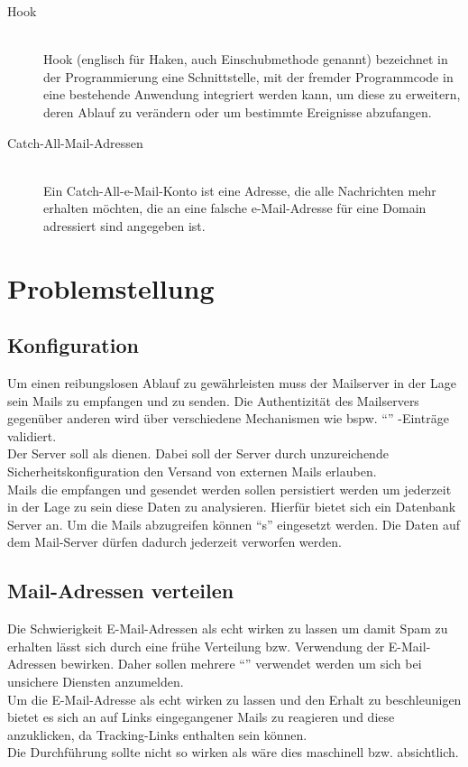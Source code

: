 \documentclass[a4paper,11pt,singlespacing]{article}
\begin{document}
\begin{description}
	\item[Hook\label{itm:Hook}]\hfill \\
		Hook (englisch für Haken, auch Einschubmethode genannt) bezeichnet in der Programmierung eine Schnittstelle, mit der fremder Programmcode in eine bestehende Anwendung integriert werden kann, um diese zu erweitern, deren Ablauf zu verändern oder um bestimmte Ereignisse abzufangen.\cite{Hook}
	\item[Catch-All-Mail-Adressen\label{itm:Catch-All-Mail}]\hfill \\
		Ein Catch-All-e-Mail-Konto ist eine Adresse, die alle Nachrichten mehr erhalten möchten, die an eine falsche e-Mail-Adresse für eine Domain adressiert sind angegeben ist.\cite{Catch-All-Mail}
	\end{description}


\section{Problemstellung}\label{sec:Problemstellung}
	\subsection{Konfiguration}\label{sec:ProblemstellungKonfiguration}
		Um einen reibungslosen Ablauf zu gewährleisten muss der Mailserver in der Lage sein Mails zu empfangen und zu senden.
		Die Authentizität des Mailservers gegenüber anderen wird über verschiedene Mechanismen wie bspw. "`"' -Einträge validiert.
		\\
		Der Server soll als  dienen.
		Dabei soll der Server durch unzureichende Sicherheitskonfiguration den Versand von externen Mails erlauben.
		\\
		Mails die empfangen und gesendet werden sollen persistiert werden um jederzeit in der Lage zu sein diese Daten zu analysieren.
		Hierfür bietet sich ein Datenbank Server an. Um die Mails abzugreifen können "`s"' eingesetzt werden.
		Die Daten auf dem Mail-Server dürfen dadurch jederzeit verworfen werden.

	\subsection{Mail-Adressen verteilen}\label{sec:ProblemstellungMailsVerteilen}
		Die Schwierigkeit E-Mail-Adressen als echt wirken zu lassen um damit Spam zu erhalten lässt sich durch eine frühe Verteilung bzw. Verwendung der E-Mail-Adressen bewirken.
		Daher sollen mehrere "`"' verwendet werden um sich bei unsichere Diensten anzumelden.
		\\
		Um die E-Mail-Adresse als echt wirken zu lassen und den Erhalt zu beschleunigen bietet es sich an auf Links eingegangener Mails zu reagieren und diese anzuklicken, da Tracking-Links enthalten sein können. %
		\\
		Die Durchführung sollte nicht so wirken als wäre dies maschinell bzw. absichtlich.
	
\end{document}
